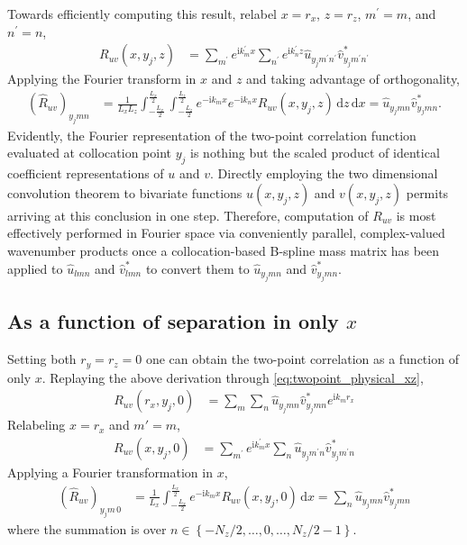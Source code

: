 \documentclass[letterpaper,11pt,nointlimits,reqno]{amsart}
\newcommand{\ii}{\ensuremath{\mathrm{i}}}
\begin{document}
Towards efficiently computing this result, relabel $x = r_x$, $z = r_z$,
$m^\prime = m$, and $n^\prime = n$,
\begin{align}
R_{uv} \left( x, y_j, z \right)
  &=
     \sum_{m^\prime}
     e^{\ii k_m^\prime x}
     \sum_{n^\prime}
     e^{\ii k_n^\prime z}
     \hat{u}_{y_j m^\prime n^\prime}
     \hat{v}^\ast_{y_j m^\prime n^\prime}
\end{align}
Applying the Fourier transform in $x$ and $z$ and taking advantage of
orthogonality,
\begin{align}
     \left(\hat{R}_{uv}\right)_{y_j m n}
  &=
     \frac{1}{L_x L_z}
     \int_{-\frac{L_x}{2}}^{\frac{L_x}{2}}
     \int_{-\frac{L_z}{2}}^{\frac{L_z}{2}}
     e^{-\ii k_m x}
     e^{-\ii k_n x}
     R_{uv} \left( x, y_j, z \right)
     \,\mathrm{d}z
     \,\mathrm{d}x
   =
     \hat{u}_{y_j m n} \hat{v}^\ast_{y_j m n}.
\end{align}
Evidently, the Fourier representation of the two-point correlation function
evaluated at collocation point $y_j$ is nothing but the scaled product of
identical coefficient representations of $u$ and $v$.  Directly employing the
two dimensional convolution theorem to bivariate functions $u(x, y_j, z)$ and
$v(x, y_j, z)$ permits arriving at this conclusion in one step.  Therefore,
computation of $R_{uv}$ is most effectively performed in Fourier space via
conveniently parallel, complex-valued wavenumber products once a
collocation-based B-spline mass matrix has been applied to $\hat{u}_{lmn}$ and
$\hat{v}^\ast_{lmn}$ to convert them to $\hat{u}_{y_j m n}$ and
$\hat{v}^\ast_{y_j m n}$.

\subsection{As a function of separation in only $x$}

Setting both $r_y = r_z = 0$ one can obtain the two-point correlation as a
function of only $x$.  Replaying the above derivation through
\eqref{eq:twopoint_physical_xz},
\begin{align}
R_{uv} \left( r_x, y_j, 0 \right)
  &=
     \sum_{m}
     \sum_{n}
     \hat{u}_{y_j m n}
     \hat{v}^\ast_{y_j m n}
     e^{\ii k_m r_x}
\end{align}
Relabeling $x = r_x$ and $m'=m$,
\begin{align}
R_{uv} \left( x, y_j, 0 \right)
  &=
     \sum_{m^\prime}
     e^{\ii k_m^\prime x}
     \sum_{n}
     \hat{u}_{y_j m^\prime n}
     \hat{v}^\ast_{y_j m^\prime n}
\end{align}
Applying a Fourier transformation in $x$,
\begin{align}
     \left(\hat{R}_{uv}\right)_{y_j m \, 0}
  &=
     \frac{1}{L_x}
     \int_{-\frac{L_x}{2}}^{\frac{L_x}{2}}
     e^{-\ii k_m x}
     R_{uv} \left( x, y_j, 0 \right)
     \,\mathrm{d}x
   =
     \sum_{n}
     \hat{u}_{y_j m n}
     \hat{v}^\ast_{y_j m n}
\end{align}
where the summation is over $n \in \left\{-N_z/2, \dots, 0, \dots,
N_z/2-1\right\}$.
\end{document}
